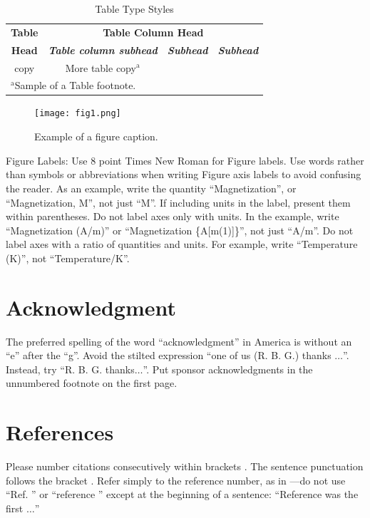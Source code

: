 \documentclass[conference]{IEEEtran}
\begin{document}
\begin{table}[htbp]
\caption{Table Type Styles}
\begin{center}
\begin{tabular}{|c|c|c|c|}
\hline
\textbf{Table}&\multicolumn{3}{|c|}{\textbf{Table Column Head}} \\
\cline{2-4}
\textbf{Head} & \textbf{\textit{Table column subhead}}& \textbf{\textit{Subhead}}& \textbf{\textit{Subhead}} \\
\hline
copy& More table copy$^{\mathrm{a}}$& &  \\
\hline
\multicolumn{4}{l}{$^{\mathrm{a}}$Sample of a Table footnote.}
\end{tabular}
\label{tab1}
\end{center}
\end{table}

\begin{figure}[htbp]
\centerline{\texttt{[image: fig1.png]}}
\caption{Example of a figure caption.}
\label{fig}
\end{figure}

Figure Labels: Use 8 point Times New Roman for Figure labels. Use words
rather than symbols or abbreviations when writing Figure axis labels to
avoid confusing the reader. As an example, write the quantity
``Magnetization'', or ``Magnetization, M'', not just ``M''. If including
units in the label, present them within parentheses. Do not label axes only
with units. In the example, write ``Magnetization (A/m)'' or ``Magnetization
\{A[m(1)]\}'', not just ``A/m''. Do not label axes with a ratio of
quantities and units. For example, write ``Temperature (K)'', not
``Temperature/K''.

\section*{Acknowledgment}

The preferred spelling of the word ``acknowledgment'' in America is without
an ``e'' after the ``g''. Avoid the stilted expression ``one of us (R. B.
G.) thanks $\ldots$''. Instead, try ``R. B. G. thanks$\ldots$''. Put sponsor
acknowledgments in the unnumbered footnote on the first page.

\section*{References}

Please number citations consecutively within brackets \cite{b1}. The
sentence punctuation follows the bracket \cite{b2}. Refer simply to the reference
number, as in \cite{b3}---do not use ``Ref. \cite{b3}'' or ``reference \cite{b3}'' except at
the beginning of a sentence: ``Reference \cite{b3} was the first $\ldots$''
\end{document}
